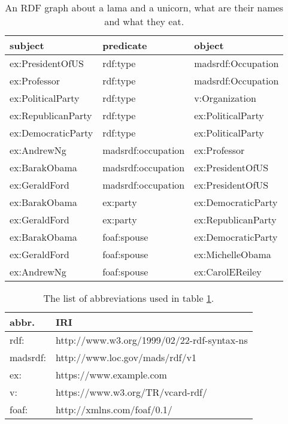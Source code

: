 \begin{table}[h]
	\centering
	\begin{tabular}{lll}
		\textbf{subject} & \textbf{predicate} & \textbf{object} \\ \hline
		ex:PresidentOfUS          &        rdf:type            &        madsrdf:Occupation       \\
		ex:Professor          &        rdf:type            &        madsrdf:Occupation       \\
		ex:PoliticalParty			&          rdf:type          &          v:Organization     \\
		ex:RepublicanParty			&          rdf:type          &          ex:PoliticalParty     \\
		ex:DemocraticParty			&          rdf:type          &          ex:PoliticalParty     \\
		ex:AndrewNg          &        madsrdf:occupation           &      ex:Professor         \\
		ex:BarakObama          &        madsrdf:occupation           &       ex:PresidentOfUS         \\
		ex:GeraldFord          &        madsrdf:occupation           &       ex:PresidentOfUS         \\
		ex:BarakObama          &        ex:party           &       ex:DemocraticParty	         \\
		ex:GeraldFord          &        ex:party           &       ex:RepublicanParty         \\
		ex:BarakObama          &        foaf:spouse           &       ex:DemocraticParty	         \\
		ex:GeraldFord          &        foaf:spouse           &       ex:MichelleObama         \\
		ex:AndrewNg          &        foaf:spouse           &       ex:CarolEReiley         \\
	\end{tabular}
	\caption{An RDF graph about a lama and a unicorn, what are their names and what they eat.}
	\label{tab:rdf_graph_example}
\end{table}


\begin{table}[h]
	\centering
	\begin{tabular}{ll}
		\textbf{abbr.} & \textbf{IRI}  \\ \hline
		rdf:         &        http://www.w3.org/1999/02/22-rdf-syntax-ns       \\
		madsrdf:          &        	http://www.loc.gov/mads/rdf/v1                 \\
		ex:			&          https://www.example.com            \\
		v:			&          https://www.w3.org/TR/vcard-rdf/          \\
		foaf:			&         http://xmlns.com/foaf/0.1/           \\
	\end{tabular}
	\caption{The list of abbreviations used in table \ref{tab:rdf_graph_example}.}
	\label{tab:rdf_graph_abbr}
\end{table}


